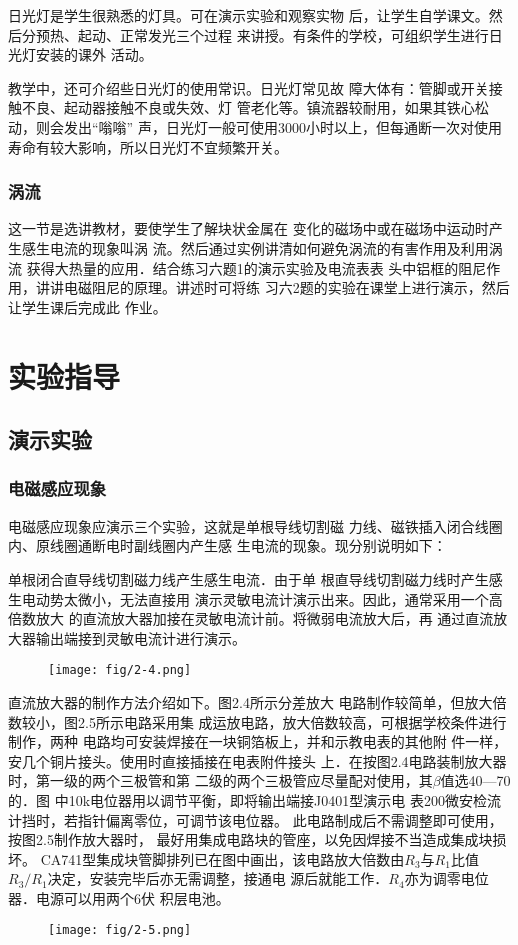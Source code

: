 日光灯是学生很熟悉的灯具。可在演示实验和观察实物
后，让学生自学课文。然后分预热、起动、正常发光三个过程
来讲授。有条件的学校，可组织学生进行日光灯安装的课外
活动。

教学中，还可介绍些日光灯的使用常识。日光灯常见故
障大体有：管脚或开关接触不良、起动器接触不良或失效、灯
管老化等。镇流器较耐用，如果其铁心松动，则会发出“嗡嗡”
声，日光灯一般可使用3000小时以上，但每通断一次对使用
寿命有较大影响，所以日光灯不宜频繁开关。

\subsubsection{涡流}

这一节是选讲教材，要使学生了解块状金属在
变化的磁场中或在磁场中运动时产生感生电流的现象叫涡
流。然后通过实例讲清如何避免涡流的有害作用及利用涡流
获得大热量的应用．结合练习六题1的演示实验及电流表表
头中铝框的阻尼作用，讲讲电磁阻尼的原理。讲述时可将练
习六2题的实验在课堂上进行演示，然后让学生课后完成此
作业。

\section{实验指导}
\subsection{演示实验}
\subsubsection{电磁感应现象}
电磁感应现象应演示三个实验，这就是单根导线切割磁
力线、磁铁插入闭合线圈内、原线圈通断电时副线圈内产生感
生电流的现象。现分别说明如下：

单根闭合直导线切割磁力线产生感生电流．由于单
根直导线切割磁力线时产生感生电动势太微小，无法直接用
演示灵敏电流计演示出来。因此，通常采用一个高倍数放大
的直流放大器加接在灵敏电流计前。将微弱电流放大后，再
通过直流放大器输出端接到灵敏电流计进行演示。
\begin{figure}[htp]
    \centering
\texttt{[image: fig/2-4.png]}
    \caption{}
\end{figure}

直流放大器的制作方法介绍如下。图2.4所示分差放大
电路制作较简单，但放大倍数较小，图2.5所示电路采用集
成运放电路，放大倍数较高，可根据学校条件进行制作，两种
电路均可安装焊接在一块铜箔板上，并和示教电表的其他附
件一样，安几个铜片接头。使用时直接插接在电表附件接头
上．在按图2.4电路装制放大器时，第一级的两个三极管和第
二级的两个三极管应尽量配对使用，其$\beta$值选40—70的．图
中10k电位器用以调节平衡，即将输出端接J0401型演示电
表200微安检流计挡时，若指针偏离零位，可调节该电位器。
此电路制成后不需调整即可使用，按图2.5制作放大器时，
最好用集成电路块的管座，以免因焊接不当造成集成块损坏。
CA741型集成块管脚排列已在图中画出，该电路放大倍数由$R_3$与$R_1$比值$R_3/R_1$决定，安装完毕后亦无需调整，接通电
源后就能工作．$R_4$亦为调零电位器．电源可以用两个6伏
积层电池。
\begin{figure}[htp]
    \centering
\texttt{[image: fig/2-5.png]}
    \caption{}
\end{figure}

